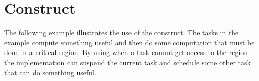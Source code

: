 \pagebreak
\section{ Construct}
\label{sec:taskyield}

The following example illustrates the use of the  construct. 
The tasks in the example compute something useful and then do some computation 
that must be done in a critical region. By using  when a task 
cannot get access to the  region the implementation can suspend 
the current task and schedule some other task that can do something useful. 




